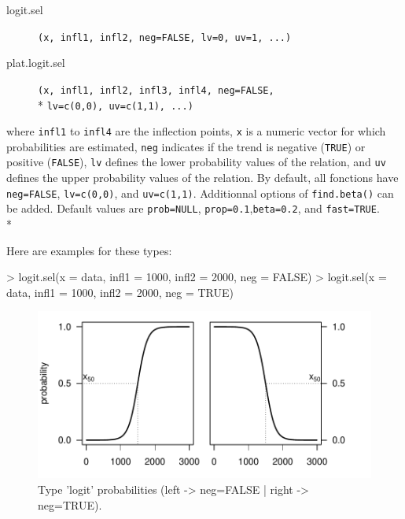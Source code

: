 \documentclass[letterpaper, 12pt]{article}
\begin{document}
\begin{description}
\item[logit.sel]\verb#(x, infl1, infl2, neg=FALSE, lv=0, uv=1, ...)#
\item[plat.logit.sel]\verb#(x, infl1, infl2, infl3, infl4, neg=FALSE,# \\* \verb#lv=c(0,0), uv=c(1,1), ...)#
\end{description}
where \verb#infl1# to \verb#infl4# are the inflection points, \verb#x# is a numeric vector for which probabilities are 
estimated, \verb#neg# indicates if the trend is negative  (\verb#TRUE#) or positive (\verb#FALSE#), \verb#lv# defines the 
lower probability values of the relation, and \verb#uv# defines the upper probability values of the relation. By default, 
all fonctions have \verb#neg=FALSE#, \verb#lv=c(0,0)#, and \verb#uv=c(1,1)#. Additionnal options of \verb#find.beta()# 
can be added. Default values are \verb#prob=NULL#, \verb#prop=0.1#,\verb#beta=0.2#, and \verb#fast=TRUE#.  \\*

Here are examples for these types:
\begin{Schunk}
\begin{Sinput}
> logit.sel(x = data, infl1 = 1000, infl2 = 2000, neg = FALSE)
> logit.sel(x = data, infl1 = 1000, infl2 = 2000, neg = TRUE)
\end{Sinput}
\end{Schunk}
\begin{figure}[h]
\vspace{-20pt}
\begin{center}
\includegraphics{relation_sel-025}
\end{center}
\vspace{-30pt}
\caption{Type 'logit' probabilities (left -> neg=FALSE |  right -> neg=TRUE).}
\vspace{-10pt}
\label{fig12}
\end{figure}
\end{document}
